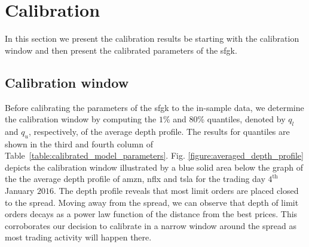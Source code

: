 \documentclass[11pt, a4paper]{thesis}  %
\begin{document}

\section{Calibration}
\label{section:result:calibration}


In this section we present the calibration results be starting with the calibration window and then present the calibrated parameters of the \ac{sfgk}.


\subsection{Calibration window}

Before calibrating the parameters of the \ac{sfgk} to the in-sample data, we determine the calibration window by computing the $1$\% and $80$\% quantiles, denoted by $q_l$ and $q_u$, respectively, of the average depth profile. The results for quantiles are shown in the third and fourth column of Table~\ref{table:calibrated_model_parameters}. Fig. \ref{figure:averaged_depth_profile} depicts the calibration window illustrated by a blue solid area below the graph of the the average depth profile of \ac{amzn}, \ac{nflx} and \ac{tsla} for the trading day $4^\textrm{th}$ January $2016$. The depth profile reveals that most limit orders are placed closed to the spread. Moving away from the spread, we can observe that depth of limit orders decays as a power law function of the distance from the best prices. This corroborates our decision to calibrate in a narrow window around the spread as most trading activity will happen there. 
\end{document}
